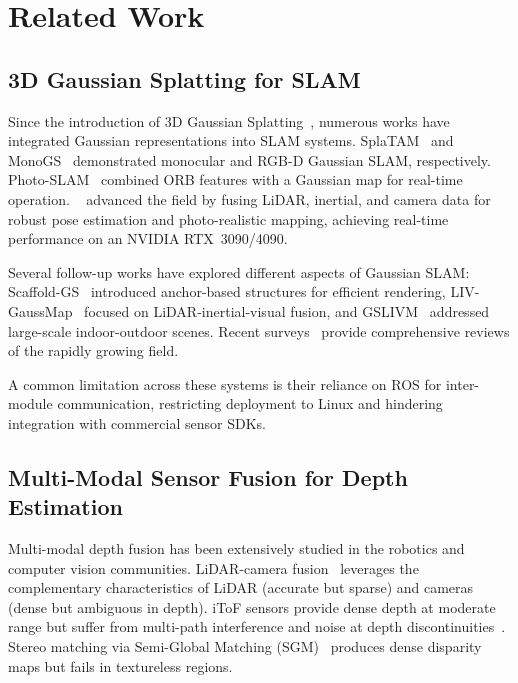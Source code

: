 \section{Related Work}
\label{sec:related}

\subsection{3D Gaussian Splatting for SLAM}

Since the introduction of 3D Gaussian Splatting~\cite{kerbl2023_3dgs},
numerous works have integrated Gaussian representations into SLAM systems.
SplaTAM~\cite{keetha2024_splatam} and MonoGS~\cite{matsuki2024_monogs}
demonstrated monocular and RGB-D Gaussian SLAM, respectively.
Photo-SLAM~\cite{huang2024_photoslam} combined ORB features with a
Gaussian map for real-time operation.
\gaussianlic~\cite{lang2026_gaussianlic2} advanced the field by fusing
LiDAR, inertial, and camera data for robust pose estimation and
photo-realistic mapping, achieving real-time performance on an NVIDIA
RTX~3090/4090.

Several follow-up works have explored different aspects of Gaussian SLAM:
Scaffold-GS~\cite{lu2024_scaffoldgs} introduced anchor-based structures
for efficient rendering, LIV-GaussMap~\cite{hong2024_livgaussmap}
focused on LiDAR-inertial-visual fusion, and
GSLIVM~\cite{xie2024_gslivm} addressed large-scale indoor-outdoor scenes.
Recent surveys~\cite{yan2024_gsslam, chen2025_egsslam} provide
comprehensive reviews of the rapidly growing field.

A common limitation across these systems is their reliance on ROS for
inter-module communication, restricting deployment to Linux and hindering
integration with commercial sensor SDKs.

\subsection{Multi-Modal Sensor Fusion for Depth Estimation}

Multi-modal depth fusion has been extensively studied in the robotics and
computer vision communities.
LiDAR-camera fusion~\cite{zheng2025_wildgsslam} leverages the complementary
characteristics of LiDAR (accurate but sparse) and cameras (dense but
ambiguous in depth).
iToF sensors provide dense depth at moderate range but suffer from
multi-path interference and noise at depth discontinuities~\cite{rang2018_4dof}.
Stereo matching via Semi-Global Matching (SGM)~\cite{hirschmuller2008_sgm}
produces dense disparity maps but fails in textureless regions.

